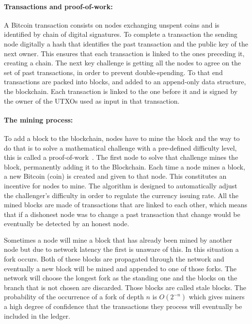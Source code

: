 \documentclass[letterpaper,twocolumn,10pt]{article}
\begin{document}
\paragraph{Transactions and proof-of-work:} A Bitcoin transaction consists on nodes exchanging unspent coins and is identified by chain of digital signatures. To complete a transaction the sending node digitally a hash that identifies the past transaction and the public key of the next owner. This ensures that each transaction is linked to the ones preceding it, creating a chain.
The next key challenge is getting all the nodes to agree on the set of past transactions, in order to prevent double-spending.
To that end transactions are packed into blocks, and added to an append-only data structure, the blockchain. Each transaction is linked to the one before it and is signed by the owner of the UTXOs used as input in that transaction.

\paragraph{The mining process:} To add a block to the blockchain, nodes have to mine the block and the way to do that is to solve a mathematical challenge with a pre-defined difficulty level, this is called a proof-of-work~\cite{Gervais:2016dd}. The first node to solve that challenge mines the block, permanently adding it to the Blockchain. Each time a node mines a block, a new Bitcoin (coin) is created and given to that node. This constitutes an incentive for nodes to mine. The algorithm is designed to automatically adjust the challenger's difficulty in order to regulate the currency issuing rate. All the mined blocks are made of transactions that are linked to each other, which means that if a dishonest node was to change a past transaction that change would be eventually be detected by an honest node.

Sometimes a node will mine a block that has already been mined by another node but due to network latency the first is unaware of this. In this situation a fork occurs. Both of these blocks are propagated through the network and eventually a new block will be mined and appended to one of those forks. The network will choose the longest fork as the standing one and the blocks on the branch that is not chosen are discarded. Those blocks are called stale blocks. The probability of the occurrence of a fork of depth $n$ is $O(2^{-n})$ which gives miners a high degree of confidence that the transactions they process will eventually be included in the ledger.
\end{document}
